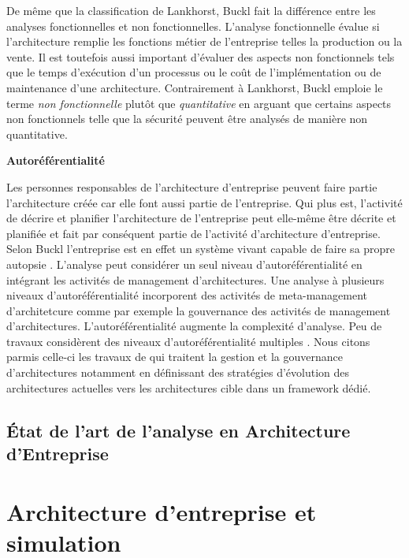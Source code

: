 \begin{description}
De même que la classification de Lankhorst, Buckl fait la différence entre les analyses fonctionnelles et non fonctionnelles. L'analyse fonctionnelle évalue si l'architecture remplie les fonctions métier de l'entreprise telles la production ou la vente. Il est toutefois aussi important d'évaluer des aspects non fonctionnels tels que le temps d'exécution d'un processus ou le coût de l'implémentation ou de maintenance d'une architecture. Contrairement à Lankhorst, Buckl emploie le terme \textit{non fonctionnelle} plutôt que \textit{quantitative} en arguant que certains aspects non fonctionnels telle que la sécurité peuvent être analysés de manière non quantitative.  

	\item \textbf{Autoréférentialité}
	
Les personnes responsables de l'architecture d'entreprise peuvent faire partie l'architecture créée car elle font aussi partie de l'entreprise. Qui plus est, l'activité de décrire et planifier l'architecture de l'entreprise peut elle-même être décrite et planifiée et fait par conséquent partie de l'activité d'architecture d'entreprise. Selon Buckl \cite{varela1974autopoiesis} l'entreprise est en effet un système vivant capable de faire sa propre autopsie \citep{varela1974autopoiesis}.
L'analyse peut considérer un seul niveau d'autoréférentialité en intégrant les activités de management d'architectures. Une analyse à plusieurs niveaux d'autoréférentialité incorporent des activités de meta-management d'architetcure comme par exemple la gouvernance des activités de management d'architectures.
L'autoréférentialité augmente la complexité d'analyse. Peu de travaux considèrent des niveaux d'autoréférentialité  multiples \cite{smook2014executable}. Nous citons parmis celle-ci les travaux de \cite{metrailler_evolis_2014} qui traitent la gestion et la gouvernance d'architectures notamment en définissant des stratégies d'évolution des architectures actuelles vers les architectures cible dans un framework dédié. 

\end{description}

\subsection{État de l'art de l'analyse en Architecture d'Entreprise} 






\section{Architecture d'entreprise et simulation}
